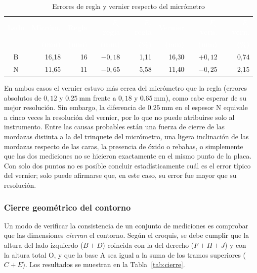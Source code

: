 \documentclass[12pt,a4paper]{article}
\newcommand{\encab}[1]{\textcolor{white}{\sffamily\bfseries #1}}
\begin{document}
\begin{table}[!htb]
	\centering
	\caption{Errores de regla y vernier respecto del micrómetro}\label{tab:micro}
	\small
	\begin{tabular}{c r r r r r r r}
		\rowcolor{darkblue}
		\encab{Lado}        & \encab{Micróm.} & \encab{Regla}       & \encab{$E_a$
			                                                              regla} &
		\encab{$E_r$ regla} & \encab{Vernier} & \encab{$E_a$ vern.} & \encab{$E_r$
			                                                              vern.}
		\\
		\rowcolor{darkblue}
		                    & \encab{(mm)}    & \encab{(mm)}        & \encab{(mm)}
		                    &
		\encab{(\%)}        & \encab{(mm)}    & \encab{(mm)}        & \encab{(\%)}
		\\
		B                   & 16,18           & 16                  & $-0{,}18$    &
		1,11
		                    & 16,30           & $+0{,}12$           & 0,74
		\\
		N                   & 11,65           & 11                  & $-0{,}65$    &
		5,58
		                    & 11,40           & $-0{,}25$           & 2,15
		\\
	\end{tabular}
\end{table}

En ambos casos el vernier estuvo más cerca del micrómetro que la regla (errores
absolutos de $0{,}12$ y $\SI{0.25}{\milli\metre}$ frente a $0{,}18$ y
$\SI{0.65}{\milli\metre}$), como cabe esperar de su mejor resolución. Sin
embargo, la diferencia de $\SI{0.25}{\milli\metre}$ en el espesor N equivale a
cinco veces la resolución del vernier, por lo que no puede atribuirse solo al
instrumento. Entre las causas probables están una fuerza de cierre de las
mordazas distinta a la del trinquete del micrómetro, una ligera inclinación de
las mordazas respecto de las caras, la presencia de óxido o rebabas, o
simplemente que las dos mediciones no se hicieron exactamente en el mismo punto
de la placa. Con solo dos puntos no es posible concluir estadísticamente cuál es
el error típico del vernier; solo puede afirmarse que, en este caso, su error
fue mayor que su resolución.

\subsubsection{Cierre geométrico del contorno}

Un modo de verificar la consistencia de un conjunto de mediciones es comprobar
que las dimensiones \emph{cierran} el contorno. Según el croquis, se debe
cumplir que la altura del lado izquierdo ($B+D$) coincida con la del derecho
($F+H+J$) y con la altura total O, y que la base A sea igual a la suma de los
tramos superiores ($C+E$). Los resultados se muestran en la
Tabla~\ref{tab:cierre}.
\end{document}
